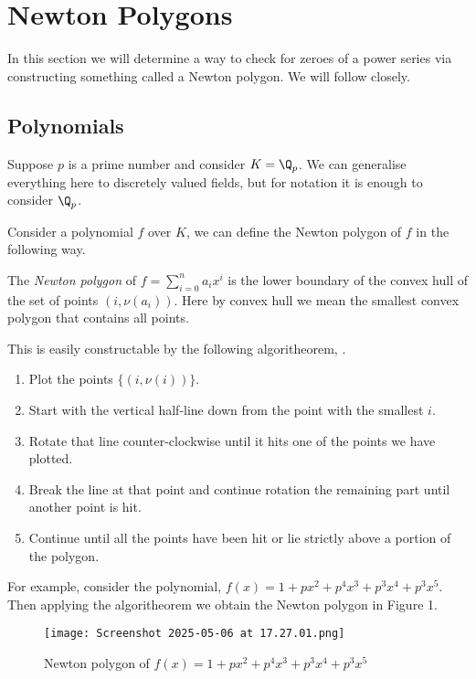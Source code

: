 \section{Newton Polygons}

In this section we will determine a way to check for zeroes of a power series via constructing
something called a Newton polygon. We will follow \cite[Section~7.4]{Gouvea} closely.

\subsection{Polynomials}

Suppose $p$ is a prime number and consider $K = \Q_p$. We can generalise everything here to
discretely valued fields, but for notation it is enough to consider $\Q_p$.

Consider a polynomial $f$ over $K$, we can define the Newton polygon of $f$ in the following way.

\begin{definition}
    The \emph{Newton polygon} of $f = \sum_{i=0}^n a_i x^i$ is the lower boundary of the convex hull
    of the set of points $(i,\nu(a_i))$.
    Here by convex hull we mean the smallest convex polygon that contains all points.
\end{definition}

This is easily constructable by the following algoritheorem, \cite[Pages~210-211]{Gouvea} .

\begin{enumerate}
    \item Plot the points $\{(i,\nu (i) )\}$.
    \item Start with the vertical half-line down from the point with the smallest $i$.
    \item Rotate that line counter-clockwise until it hits one of the points we have plotted.
    \item Break the line at that point and continue rotation the remaining part until another point
    is hit.
    \item Continue until all the points have been hit or lie strictly above a portion of the
    polygon.
\end{enumerate}

For example, consider the polynomial, $f(x) = 1 + p x^2 + p^4 x^3 + p^3 x^4 + p^3x^5$. Then applying
the algoritheorem we obtain the Newton polygon in Figure 1.

\begin{figure}[h!]
    \centering
    \texttt{[image: Screenshot 2025-05-06 at 17.27.01.png]}
    \caption{Newton polygon of $f(x)= 1 + px^2+p^4x^3+p^3x^4+p^3x^5$}
\end{figure}

